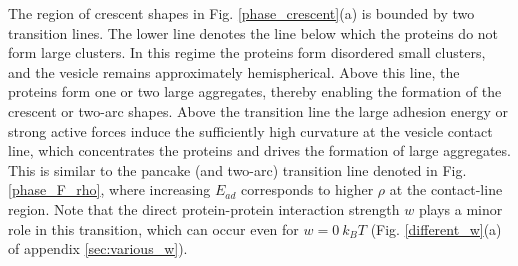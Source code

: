 \documentclass[pre,amsmath]{revtex4}
\begin{document}
The region of crescent shapes in Fig. \ref{phase_crescent}(a) is bounded by two transition lines. The lower line denotes the line below which the proteins do not form large clusters. In this regime the proteins form disordered small clusters, and the vesicle remains approximately hemispherical. Above this line, the proteins form one or two large aggregates, thereby enabling the formation of the crescent or two-arc shapes. Above the transition line the large adhesion energy or strong active forces induce the sufficiently high curvature at the vesicle contact line, which concentrates the proteins and drives the formation of large aggregates. This is similar to the pancake (and two-arc) transition line denoted in Fig. \ref{phase_F_rho}, where increasing $E_{ad}$ corresponds to higher $\rho$ at the contact-line region. Note that the direct protein-protein interaction strength $w$ plays a minor role in this transition, which can occur even for $w=0 ~k_B T$ (Fig. \ref{different_w}(a) of appendix \ref{sec:various_w}).
\end{document}
